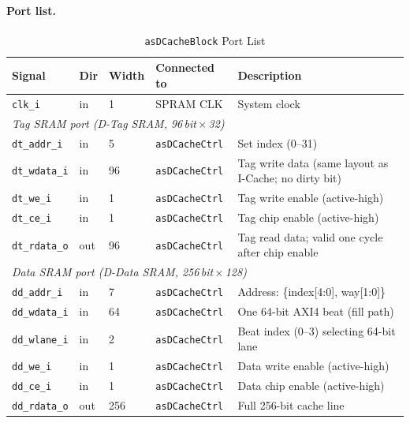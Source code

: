 \paragraph{Port list.}

\begin{table}[H]
\caption{\texttt{asDCacheBlock} Port List}
\label{tab:asDCacheBlockPorts}
\centering
\begin{tabularx}{\textwidth}{|l |l |l |l |X|}
  \hline
  Signal & Dir & Width & Connected to & Description \\
  \hline
  \hline
  \texttt{clk\_i}         & in  & 1   & SPRAM CLK             & System clock \\
  \hline
  \multicolumn{5}{|l|}{\textit{Tag SRAM port (D-Tag SRAM, 96\,bit\,$\times$\,32)}} \\
  \hline
  \texttt{dt\_addr\_i}    & in  & 5   & \texttt{asDCacheCtrl} & Set index (0--31) \\
  \hline
  \texttt{dt\_wdata\_i}   & in  & 96  & \texttt{asDCacheCtrl} & Tag write data (same layout as I-Cache; no dirty bit) \\
  \hline
  \texttt{dt\_we\_i}      & in  & 1   & \texttt{asDCacheCtrl} & Tag write enable (active-high) \\
  \hline
  \texttt{dt\_ce\_i}      & in  & 1   & \texttt{asDCacheCtrl} & Tag chip enable (active-high) \\
  \hline
  \texttt{dt\_rdata\_o}   & out & 96  & \texttt{asDCacheCtrl} & Tag read data; valid one cycle after chip enable \\
  \hline
  \multicolumn{5}{|l|}{\textit{Data SRAM port (D-Data SRAM, 256\,bit\,$\times$\,128)}} \\
  \hline
  \texttt{dd\_addr\_i}    & in  & 7   & \texttt{asDCacheCtrl} & Address: \{index[4:0], way[1:0]\} \\
  \hline
  \texttt{dd\_wdata\_i}   & in  & 64  & \texttt{asDCacheCtrl} & One 64-bit AXI4 beat (fill path) \\
  \hline
  \texttt{dd\_wlane\_i}   & in  & 2   & \texttt{asDCacheCtrl} & Beat index (0--3) selecting 64-bit lane \\
  \hline
  \texttt{dd\_we\_i}      & in  & 1   & \texttt{asDCacheCtrl} & Data write enable (active-high) \\
  \hline
  \texttt{dd\_ce\_i}      & in  & 1   & \texttt{asDCacheCtrl} & Data chip enable (active-high) \\
  \hline
  \texttt{dd\_rdata\_o}   & out & 256 & \texttt{asDCacheCtrl} & Full 256-bit cache line \\
  \hline
\end{tabularx}
\end{table}

